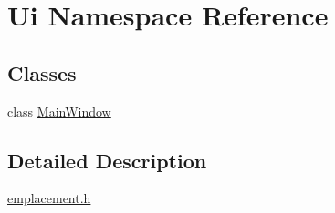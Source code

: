 \hypertarget{namespace_ui}{\section{Ui Namespace Reference}
\label{namespace_ui}
}
\subsection*{Classes}
\begin{DoxyCompactItemize}
\item 
class \hyperlink{class_ui_1_1_main_window}{Main\-Window}
\end{DoxyCompactItemize}


\subsection{Detailed Description}

\begin{DoxyCodeInclude}
\end{DoxyCodeInclude}
 \hyperlink{emplacement_8h_source}{emplacement.\-h} 